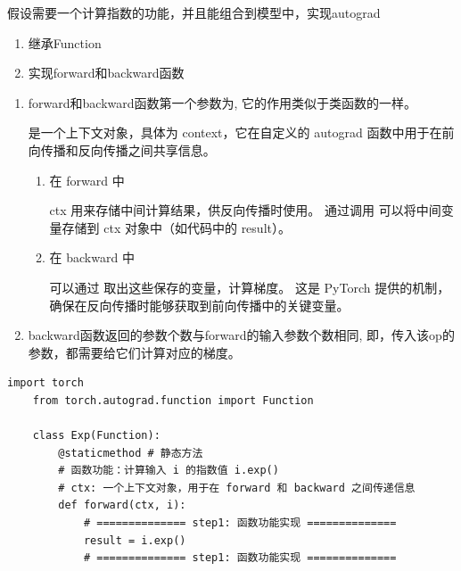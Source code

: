 \begin{example}
    \exProblem
    假设需要一个计算指数的功能，并且能组合到模型中，实现autograd

    \begin{enumerate}[label=\arabic*)]
        \item 继承Function
        \item 实现forward和backward函数
    \end{enumerate}
    
    \exSolution
    \begin{enumerate}[label=\arabic*)]
        \item forward和backward函数第一个参数为,
        它的作用类似于类函数的一样。

         是一个上下文对象，具体为 context，它在自定义的 autograd 函数中用于在前向传播和反向传播之间共享信息。

        \begin{enumerate}[itemindent=1em,label=\arabic*)]
            \item 在 forward 中
            
            ctx 用来存储中间计算结果，供反向传播时使用。
            通过调用  可以将中间变量存储到 ctx 对象中（如代码中的 result）。
            \item 在 backward 中
            
            可以通过  取出这些保存的变量，计算梯度。
            这是 PyTorch 提供的机制，确保在反向传播时能够获取到前向传播中的关键变量。
        \end{enumerate}
        
    
        \item backward函数返回的参数个数与forward的输入参数个数相同, 
        即，传入该op的参数，都需要给它们计算对应的梯度。
    \end{enumerate}
    \begin{lstlisting}[style=pythonstyle]
    import torch
    from torch.autograd.function import Function
    
    class Exp(Function):
        @staticmethod # 静态方法
        # 函数功能：计算输入 i 的指数值 i.exp()
        # ctx: 一个上下文对象，用于在 forward 和 backward 之间传递信息
        def forward(ctx, i):
            # ============== step1: 函数功能实现 ==============
            result = i.exp()
            # ============== step1: 函数功能实现 ==============
    

\end{lstlisting}
\end{example}
